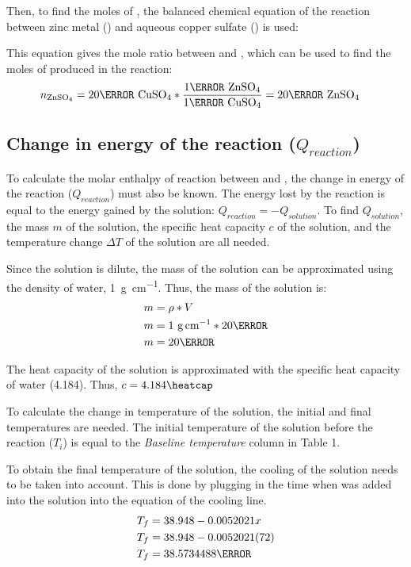 \documentclass[12pt, notitlepage, letterpaper]{report}
\begin{document}
Then, to find the moles of , the balanced chemical equation of the reaction between zinc metal () and aqueous copper sulfate () is used:

\centerline{}

This equation gives the mole ratio between  and , which can be used to find the moles of  produced in the reaction:
\begin{align*}
	n_{\ce{ZnSO4}} & = 20\mmol~\ce{CuSO4} * \frac{1\mol~{\ce{ZnSO4}}}{1\mol~{\ce{CuSO4}}} = 20\mmol~{\ce{ZnSO4}}
\end{align*}

\subsection*{Change in energy of the reaction ($Q_{reaction}$)}

To calculate the molar enthalpy of reaction between  and , the change in energy of the reaction ($Q_{reaction}$) must also be known. The energy lost by the reaction is equal to the energy gained by the solution: $Q_{reaction} = -Q_{solution}$. To find $Q_{solution}$, the mass $m$ of the solution, the specific heat capacity $c$ of the solution, and the temperature change $\Delta T$ of the solution are all needed.

Since the solution is dilute, the mass of the solution can be approximated using the density of water, 1~\unit{\gram\per\cm}. Thus, the mass of the solution is:
\begin{align*}
	m & = \rho * V                      \\
	m & = 1~\unit{\gram\per\cm} * 20\ml \\
	m & = 20\gram
\end{align*}

The heat capacity of the solution is approximated with the specific heat capacity of water (4.184\heatcap). Thus, $c = 4.184\heatcap$

To calculate the change in temperature of the solution, the initial and final temperatures are needed. The initial temperature of the solution before the reaction ($T_i$) is equal to the \textit{Baseline temperature} column in Table 1.

To obtain the final temperature of the solution, the cooling of the solution needs to be taken into account. This is done by plugging in the time when  was added into the solution into the equation of the cooling line.
\begin{align*}
	T_f & = 38.948 - 0.0052021x    \\
	T_f & = 38.948 - 0.0052021(72) \\
	T_f & = 38.5734488\celsius
\end{align*}
\end{document}
